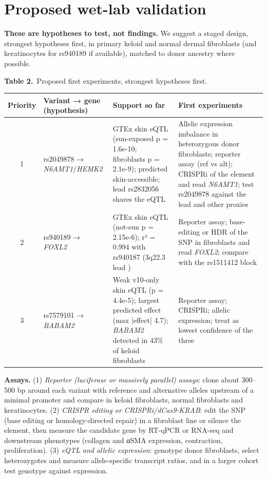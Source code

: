 \documentclass[10pt,twocolumn,a4paper]{article}
\newcommand{\tabcap}[2]{{\sffamily\footnotesize\textbf{#1}\ #2\par}\vspace{4pt}}
\begin{document}
\section{Proposed wet-lab validation}

\textbf{These are hypotheses to test, not findings.} We suggest a staged design, strongest hypotheses first, in primary keloid and normal dermal fibroblasts (and keratinocytes for rs940189 if available), matched to donor ancestry where possible.

\begin{table}[t]
\centering
\tabcap{Table 2.}{Proposed first experiments, strongest hypotheses first.}
{\footnotesize\setlength{\tabcolsep}{3pt}\renewcommand{\arraystretch}{1.18}
\begin{tabularx}{\textwidth}{@{}c>{\raggedright\arraybackslash}p{3.2cm}>{\raggedright\arraybackslash}X>{\raggedright\arraybackslash}X@{}}
\toprule
\textbf{Priority} & \textbf{Variant → gene (hypothesis)} & \textbf{Support so far} & \textbf{First experiments} \\
\midrule
1 & rs2049878 → \emph{N6AMT1}/\emph{HEMK2} & GTEx skin eQTL (sun-exposed p = 1.6e-10; fibroblasts p = 2.1e-9); predicted skin-accessible; lead rs2832056 shares the eQTL & Allelic expression imbalance in heterozygous donor fibroblasts; reporter assay (ref vs alt); CRISPRi of the element and read \emph{N6AMT1}; test rs2049878 against the lead and other proxies \\
2 & rs940189 → \emph{FOXL2} & GTEx skin eQTL (not-sun p = 2.15e-6); r² = 0.994 with rs940187 (3q22.3 lead \cite{k2,k4}) & Reporter assay; base-editing or HDR of the SNP in fibroblasts and read \emph{FOXL2}; compare with the rs1511412 block \\
3 & rs7579101 → \emph{BABAM2} & Weak v10-only skin eQTL (p = 4.4e-5); largest predicted effect (max |effect| 4.7); \emph{BABAM2} detected in 43\% of keloid fibroblasts & Reporter assay; CRISPRi; allelic expression; treat as lowest confidence of the three \\
\bottomrule
\end{tabularx}}
\end{table}

\textbf{Assays.} (1) \emph{Reporter (luciferase or massively parallel) assays}: clone about 300--500 bp around each variant with reference and alternative alleles upstream of a minimal promoter and compare in keloid fibroblasts, normal fibroblasts and keratinocytes. (2) \emph{CRISPR editing or CRISPRi/dCas9-KRAB}: edit the SNP (base editing or homology-directed repair) in a fibroblast line or silence the element, then measure the candidate gene by RT-qPCR or RNA-seq and downstream phenotypes (collagen and αSMA expression, contraction, proliferation). (3) \emph{eQTL and allelic expression}: genotype donor fibroblasts, select heterozygotes and measure allele-specific transcript ratios, and in a larger cohort test genotype against expression.
\end{document}
